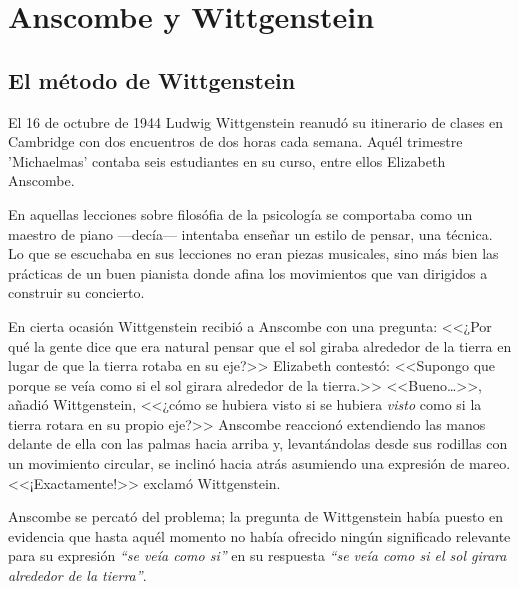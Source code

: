 \section{Anscombe y Wittgenstein}

\subsection{El método de Wittgenstein}
El 16 de octubre de 1944 Ludwig Wittgenstein reanudó su itinerario de clases en
Cambridge con dos encuentros de dos horas cada semana. Aquél trimestre
'Michaelmas' contaba seis estudiantes en su curso, entre ellos Elizabeth
Anscombe. 

 En aquellas lecciones sobre
filosófia de la psicología se comportaba como un maestro de piano ---decía---
intentaba enseñar un estilo de pensar, una técnica. Lo que se escuchaba en sus
lecciones no eran piezas musicales, sino más bien las prácticas de un buen
pianista donde afina los movimientos que van dirigidos a construir su
concierto.\autocite[p.~357]{pubnpriv}

En cierta ocasión Wittgenstein recibió a Anscombe con una pregunta: <<¿Por qué
la gente dice que era natural pensar que el sol giraba alrededor de la tierra en
lugar de que la tierra rotaba en su eje?>> Elizabeth contestó: <<Supongo que
porque se veía como si el sol girara alrededor de la tierra.>> <<Bueno\ldots>>,
añadió Wittgenstein, <<¿cómo se hubiera visto si se hubiera \emph{visto} como si
la tierra rotara en su propio eje?>> Anscombe reaccionó extendiendo las manos
delante de ella con las palmas hacia arriba y, levantándolas desde sus rodillas
con un movimiento circular, se inclinó hacia atrás asumiendo una expresión de
mareo. <<¡Exactamente!>> exclamó Wittgenstein.\autocite[cf.~][p.~151]{IWT}

Anscombe se percató del problema; la pregunta de Wittgenstein había puesto en
evidencia que hasta aquél momento no había ofrecido ningún significado relevante
para su expresión \emph{``se veía como si''} en su respuesta \emph{``se veía
  como si el sol girara alrededor de la tierra''}.

